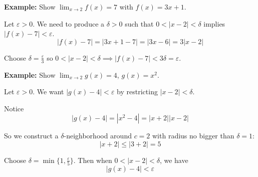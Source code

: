 \documentclass[12pt]{report}
\newcommand{\abs}[1]{\left\vert #1 \right\vert}
\newcommand{\ep}{\varepsilon}
\begin{document}
    \textbf{Example:} Show $\lim_{x \to 2} f(x) = 7$ with $f(x) = 3x + 1$. 

    Let $\ep > 0$. We need to produce a $\delta > 0$ such that $0 < \abs{x - 2} < \delta$ implies $\abs{f(x) - 7} < \ep$. 
    \[\abs{f(x) - 7} = \abs{3x + 1 - 7} = \abs{3x - 6} = 3\abs{x - 2}\]

    Choose $\delta = \frac{\ep}{3}$ so $0 < \abs{x - 2} < \delta \implies \abs{f(x) - 7} < 3\delta = \ep$.

    \textbf{Example:} Show $\lim_{x\to 2} g(x) = 4$, $g(x) = x^2$. 

    Let $\ep > 0$. We want $\abs{g(x) - 4} < \ep$ by restricting $\abs{x - 2} < \delta$. 

    Notice
    \[\abs{g(x) - 4} = \abs{x^2 - 4} = \abs{x + 2}\abs{x - 2}\] 

    So we construct a $\delta$-neighborhood around $c = 2$ with radius no bigger than $\delta = 1$: 
    \[\abs{x + 2} \leq \abs{3 + 2} = 5\] 

    Choose $\delta = \min\{1, \frac{\ep}{5}\}$. Then when $0 < \abs{x - 2} < \delta$, we have 
    \[\abs{g(x) -4} < \ep\]
\end{document}
